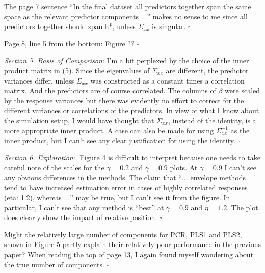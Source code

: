 \documentclass[11pt, a4paper]{article}
\begin{document}
The page 7 sentence ``In the final dataset all predictors together span the same space as the relevant predictor components $\ldots$'' makes no sense to me since all predictors together should span $\mathbb{R}^p$, unless $\Sigma_{xx}$ is singular. 
$\square$

Page 8, line 5 from the bottom: Figure ?? $\square$

\textit{Section 5. Basis of Comparison}: I’m a bit perplexed by the choice of the inner product matrix in (5). Since the eigenvalues of $\Sigma_{xx}$ are different, the predictor variances differ, unless $\Sigma_{xx}$ was constructed as a constant times a correlation matrix. And the predictors are of course correlated. The columns of $\beta$ were scaled by the response variances but there was evidently no effort to correct for the different variances or correlations of the predictors. In view of what I know about the simulation setup, I would have thought that $\Sigma_{xx}$, instead of the identity, is a more appropriate inner product. A case can also be made for using $\Sigma_{xx}^{-1}$ as the inner product, but I can’t see any clear justification for using the identity.
$\square$

\textit{Section 6. Exploration}:. Figure 4 is difficult to interpret because one needs to take careful note of the scales for the $\gamma = 0.2$ and $\gamma = 0.9$ plots. At $\gamma = 0.9$ I can’t see any obvious differences in the methods. The claim that ``$\ldots$ envelope methods tend to have increased estimation error in cases of highly correlated responses (eta: 1.2), whereas $\ldots$'' may be true,
but I can’t see it from the figure. In particular, I can’t see that any method is “best” at $\gamma = 0.9$ and $\eta = 1.2$. The plot does clearly show the impact of relative position.
$\square$

Might the relatively large number of components for PCR, PLS1 and PLS2, shown in Figure 5 partly explain their relatively poor performance in the previous paper? When reading the top of page 13, I again found myself wondering about the true number of components.
$\square$
\end{document}
